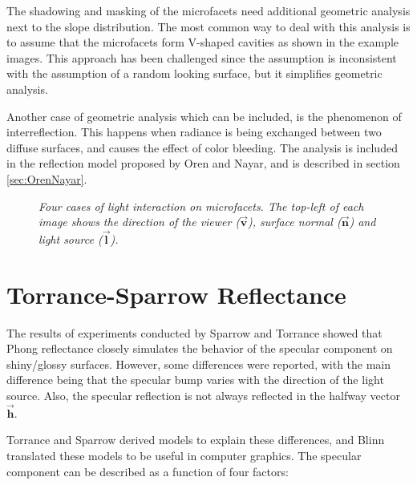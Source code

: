 The shadowing and masking of the microfacets need additional geometric analysis next to the slope distribution. The most common way to deal with this analysis is to assume that the microfacets form V-shaped cavities as shown in the example images. This approach has been challenged since the assumption is inconsistent with the assumption of a random looking surface, but it simplifies geometric analysis.

Another case of geometric analysis which can be included, is the phenomenon of interreflection. This happens when radiance is being exchanged between two diffuse surfaces, and causes the effect of color bleeding. The analysis is included in the reflection model proposed by Oren and Nayar, and is described in section \ref{sec:OrenNayar}.

\begin{figure}[H]
	\begin{center}
	\end{center}
	\caption{{\it Four cases of light interaction on microfacets. The top-left of each image shows the direction of the viewer ($\vec{\mathbf{v}}$), surface normal ($\vec{\mathbf{n}}$) and light source ($\vec{\mathbf{l}}$).}}
	\label{fig:GAF}
\end{figure}


\section{Torrance-Sparrow Reflectance}\label{sec:CookTorrance}
	The results of experiments conducted by Sparrow and Torrance \cite{TorranceSparrow} showed that Phong reflectance closely simulates the behavior of the specular component on shiny/glossy surfaces. However, some differences were reported, with the main difference being that the specular bump varies with the direction of the light source. Also, the specular reflection is not always reflected in the halfway vector $\vec{\mathbf{h}}$. 

Torrance and Sparrow derived models to explain these differences, and Blinn translated these models to be useful in computer graphics. The specular component can be described as a function of four factors: 
	
